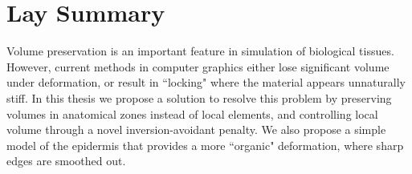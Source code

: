 

\chapter{Lay Summary}

Volume preservation is an important feature in simulation of biological tissues.
However, current methods in computer graphics either lose significant volume under deformation, or result in ``locking" where the material appears unnaturally stiff.
In this thesis we propose a solution to resolve this problem by preserving volumes in anatomical zones instead of local elements, and controlling local volume through a novel inversion-avoidant penalty.
We also propose a simple model of the epidermis that provides a more ``organic" deformation, where sharp edges are smoothed out.
